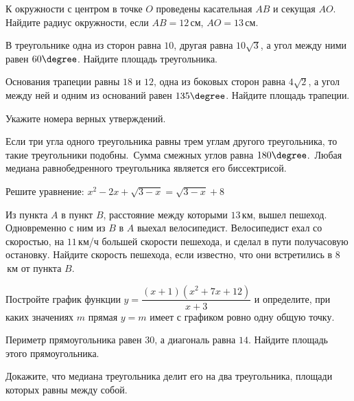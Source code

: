 \begin{class}[number=1]
\begin{listofex}
		\item К окружности с центром в точке \(O\) проведены касательная \(AB\) и секущая \(AO\). Найдите радиус окружности, если \(AB=12\) см, \(AO=13\) см.
		\item В треугольнике одна из сторон равна \(10\), другая равна \(10\sqrt{3}\), а угол между ними равен \(60\degree\). Найдите площадь треугольника.
		\item Основания трапеции равны \(18\) и \(12\), одна из боковых сторон равна \(4\sqrt{2}\), а угол между ней и одним из оснований равен \(135\degree\). Найдите площадь трапеции.
		\item Укажите номера верных утверждений.
		\begin{tasks}
			\task Если три угла одного треугольника равны трем углам другого треугольника, то такие треугольники подобны. 
			\task Сумма смежных углов равна \(180\degree\).
			\task Любая медиана равнобедренного треугольника является его биссектрисой.
		\end{tasks}
		\item Решите уравнение: \(x^2-2x+\sqrt{3-x}=\sqrt{3-x}+8\)
		\item Из пункта \(A\) в пункт \(B\), расстояние между которыми \(13\) км, вышел пешеход. Одновременно с ним из \(B\) в \(A\) выехал велосипедист. Велосипедист ехал со скоростью, на \(11\) км/ч большей скорости пешехода, и сделал в пути получасовую остановку. Найдите скорость пешехода, если известно, что они встретились в \(8\) км от пункта \(B\).
		\item Постройте график функции \(y=\dfrac{ (x+1)(x^2+7x+12) }{ x+3 }\) и определите, при каких значениях \(m\) прямая \(y=m\) имеет с графиком ровно одну общую точку.
		\item Периметр прямоугольника равен \(30\), а диагональ равна \(14\). Найдите площадь этого прямоугольника.
		\item Докажите, что медиана треугольника делит его на два треугольника, площади которых равны между собой.
	\end{listofex}
\end{class}

